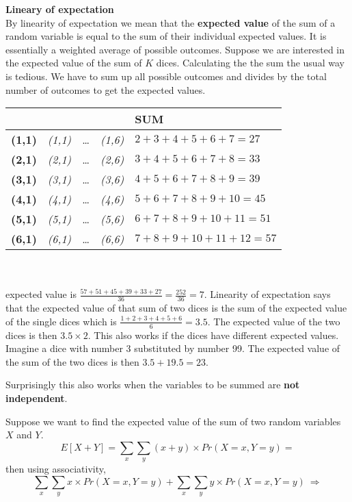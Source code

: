 \begin{framed}
\textbf{Lineary of expectation} \hfill \\
By linearity of expectation we mean that the \textbf{expected value} of the sum of a random variable is equal to the sum of their individual expected values. It is essentially a weighted average of possible outcomes. Suppose we are interested in the expected value of the sum of $K$ dices. Calculating the the sum the usual way is tedious. We have to sum up all possible outcomes and divides by the total number of outcomes to get the expected values. 

\begin{tabular}{|l|l|l|l|l|}
\hline
\textbf{} & \textit{} &  & \textit{} & \textbf{SUM} \\ \hline
\textbf{(1,1)} & \textit{(1,1)} & \ldots & \textit{(1,6)} & $2+3+4+5+6+7=27 $ \\ \hline
\textbf{(2,1)} & \textit{(2,1)} & \ldots & \textit{(2,6)} & $3+4+5+6+7+8=33$ \\ \hline
\textbf{(3,1)} & \textit{(3,1)} & \ldots & \textit{(3,6)} & $4+5+6+7+8+9=39$ \\ \hline
\textbf{(4,1)} & \textit{(4,1)} & \ldots & \textit{(4,6)} & $5+6+7+8+9+10=45$ \\ \hline
\textbf{(5,1)} & \textit{(5,1)} & \ldots & \textit{(5,6)} & $6+7+8+9+10+11=51$ \\ \hline
\textbf{(6,1)} & \textit{(6,1)} & \ldots & \textit{(6,6)} & $7+8+9+10+11+12=57$ \\ \hline
\end{tabular}\hfill \\ \hfill \\

expected value is $\frac{57+51+45+39+33+27}{36}=\frac{252}{36}=7$. 
Linearity of expectation says that  the expected value of that sum of two dices is  the sum of the expected value of the single dices which is $\frac{1+2+3+4+5+6}{6}=3.5$. The expected value of the two dices is then $3.5\times 2$.
This also works if the dices have different expected values. Imagine a dice with number 3 substituted by number 99. The expected value of the sum of the two dices is then $3.5+19.5 = 23$.

Surprisingly this also works when the variables to be summed are \textbf{not independent}.

Suppose we want to find the expected value of the sum of two random variables $X$ and $Y$.
\[
E[X+Y] = \sum_x \sum_y (x+y) \times Pr(X=x,Y=y)  =
\]
then using associativity,
\[\sum_x \sum_y x \times Pr(X=x,Y=y) + \sum_x \sum_y y \times Pr(X=x,Y=y) \: \Longrightarrow\]


\end{framed}
